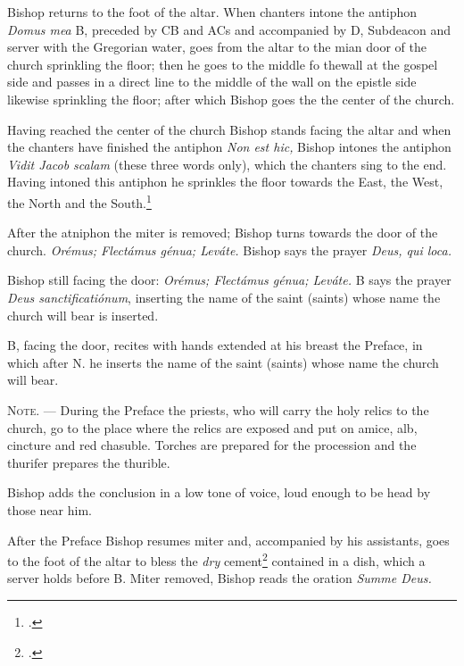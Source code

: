 \documentclass[letterpaper]{report}
\begin{document}
{\rubric Bishop returns to the foot of the altar. When chanters intone the antiphon
\textit{Domus mea} B, preceded by CB and ACs and accompanied by D, Subdeacon and
server with the Gregorian water, goes from the altar to the mian door of the
church sprinkling the floor; then he goes to the middle fo thewall at the
gospel side and passes in a direct line to the middle of the wall on the
epistle side likewise sprinkling the floor; after which Bishop goes the the center
of the church.

\rubric Having reached the center of the church Bishop stands facing the altar and
when the chanters have finished the antiphon \textit{Non est hic,} Bishop intones
the antiphon \textit{Vidit Jacob scalam} (these three words only), which the
chanters sing to the end. Having intoned this antiphon he sprinkles the floor
towards the East, the West, the North and the South.\footcite[The Rubric in the
\textit{Pontificale Romanum} supposes the altar to be towards the East; the
bishop, therefore, sprinkles the floor before him, behind him, at his left and
than at his right.][footnote 1, p. 74.]{consecranda}

\rubric After the atniphon the miter is removed; Bishop turns towards the door of
the church. \textit{Orémus; Flectámus génua; Leváte.} Bishop says the prayer
\textit{Deus, qui loca.}

\rubric Bishop still facing the door: \textit{Orémus; Flectámus génua; Leváte.} B
says the prayer \textit{Deus sanctificatiónum}, inserting the name of the saint
(saints) whose name the church will bear is inserted.

\rubric B, facing the door, recites with hands extended at his breast the
Preface, in which after N. he inserts the name of the saint (saints) whose name
the church will bear.

\textsc{Note. ---} During the Preface the priests, who will carry the holy
relics to the church, go to the place where the relics are exposed and put on
amice, alb, cincture and red chasuble. Torches are prepared for the procession
and the thurifer prepares the thurible.

Bishop adds the conclusion in a low tone of voice, loud enough to be head by those
near him.

\rubric After the Preface Bishop resumes miter and, accompanied by his assistants,
goes to the foot of the altar to bless the \textit{dry} cement\footcite[The
Pontifical prescrives that he should first mix the cement with the water which
he previously blessed and then bless the mixture. This is not feasible and
consequently it is better to keep sufficient amount of water in a separate
vessel to be poured over the dry cement shortly before it is to be used for
closing the sepulchre.][footnote, p. 77.]{consecranda} contained in a dish,
which a server holds before B. Miter removed, Bishop reads the oration \textit{Summe
Deus.}

}
\end{document}

